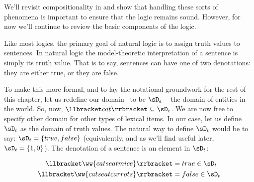 We'll revisit compositionality in  and show that handling these sorts
  of phenomena is important to ensure that the logic remains sound.
However, for now we'll continue to review the basic components of the logic.


Like most logics, the primary goal of natural logic is to assign truth
  values to sentences.
In natural logic the model-theoretic interpretation of
  a sentence is simply its truth value.
That is to say, sentences can have one of two denotations: they are either true, or they
  are false.

To make this more formal, and to lay the notational groundwork for the rest of this chapter,
  let us redefine our domain \sD\ to be $\sD_e$ -- the domain of entities in the world.
So, now, $\llbracket cat \rrbracket \subseteq \sD_e$.
We are now free to specify other domain for other types of lexical items.
In our case, let us define $\sD_t$ as the domain of truth values.
The natural way to define $\sD_t$ would be to say: $\sD_t = \{true, false\}$
  (equivalently, and as we'll find useful later, $\sD_t = \{1, 0\}$).
The denotation of a sentence is an element in $\sD_t$:

\begin{align*}
\llbracket\ww{cats eat mice}\rrbracket &= true \in \sD_t \\
\llbracket\ww{cats eat carrots}\rrbracket &= false \in \sD_t
\end{align*}

%
%



